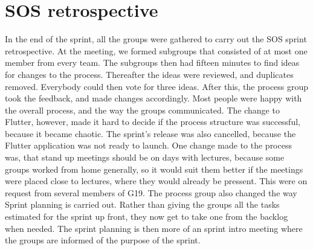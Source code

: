 \section{SOS retrospective}
In the end of the sprint, all the groups were gathered to carry out the SOS sprint retrospective. 
At the meeting, we formed subgroups that consisted of at most one member from every team. 
The subgroups then had fifteen minutes to find ideas for changes to the process. 
Thereafter the ideas were reviewed, and duplicates removed. Everybody could then vote for three ideas. 
After this, the process group took the feedback, and made changes accordingly. 
Most people were happy with the overall process, and the way the groups communicated. 
The change to Flutter, however, made it hard to decide if the process structure was successful, because it became chaotic.
The sprint's release was also cancelled, because the Flutter application was not ready to launch. 
One change made to the process was, that stand up meetings should be on days with lectures, because some groups worked from home generally, so it would suit them better if the meetings were placed close to lectures, where they would already be pressent.
This were on request from several members of G19. 
The process group also changed the way Sprint planning is carried out.
Rather than giving the groups all the tasks estimated for the sprint up front, they now get to take one from the backlog when needed. 
The sprint planning is then more of an sprint intro meeting where the groups are informed of the purpose of the sprint. 

